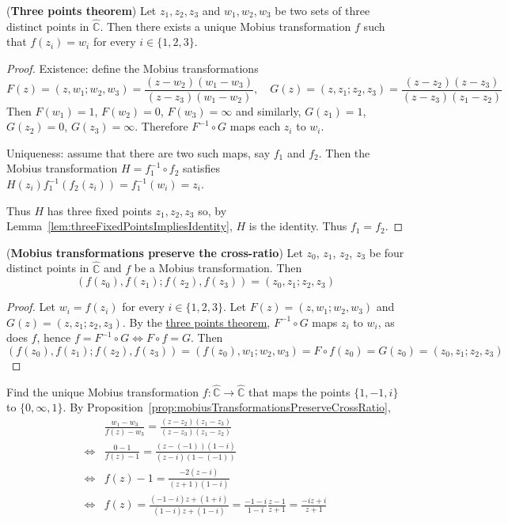\begin{theorem}\label{thm:threePointsTheorem}
	(\textbf{Three points theorem}) Let ${z_1, z_2, z_3}$ and ${w_1, w_2, w_3}$ be two sets of three distinct points in $\hat{\mathbb{C}}$. Then there exists a unique Mobius transformation $f$ such that $f(z_i) = w_i$ for every $i \in \{1, 2, 3\}$.
\end{theorem}

\begin{proof}
	Existence: define the Mobius transformations
	\[
		F(z) = (z, w_1; w_2, w_3) = \frac{(z - w_2)(w_1 - w_3)}{(z - z_3)(w_1 - w_2)}, \quad G(z) = (z, z_1; z_2, z_3) = \frac{(z - z_2)(z - z_3)}{(z - z_3)(z_1 - z_2)}
	\]
	Then $F(w_1) = 1$, $F(w_2) = 0$, $F(w_3) = \infty$ and similarly, $G(z_1) = 1$, $G(z_2) = 0$, $G(z_3) = \infty$. Therefore $F^{-1} \circ G$ maps each $z_i$ to $w_i$.

	Uniqueness: assume that there are two such maps, say $f_1$ and $f_2$. Then the Mobius transformation $H = f_1^{-1} \circ f_2$ satisfies $H(z_i) f_1^{-1}(f_2(z_i)) = f_1^{-1}(w_i) = z_i$.

	Thus $H$ has three fixed points $z_1, z_2, z_3$ so, by Lemma~\ref{lem:threeFixedPointsImpliesIdentity}, $H$ is the identity. Thus $f_1 = f_2$.
\end{proof}

\begin{proposition}\label{prop:mobiusTransformationsPreserveCrossRatio}
	(\textbf{Mobius transformations preserve the cross-ratio}) Let $z_0$, $z_1$, $z_2$, $z_3$ be four distinct points in $\hat{\mathbb{C}}$ and $f$ be a Mobius transformation. Then
	\[
		(f(z_0), f(z_1); f(z_2), f(z_3)) = (z_0, z_1; z_2, z_3)
	\]
\end{proposition}

\begin{proof}
	Let $w_i = f(z_i)$ for every $i \in \{1, 2, 3\}$. Let $F(z) = (z, w_1; w_2, w_3)$ and $G(z) = (z, z_1; z_2, z_3)$. By the \hyperref[thm:threePointsTheorem]{three points theorem}, $F^{-1} \circ G$ maps $z_i$ to $w_i$, as does $f$, hence $f = F^{-1} \circ G \Longleftrightarrow F \circ f = G$. Then
	\[
		(f(z_0), f(z_1); f(z_2), f(z_3)) = (f(z_0), w_1; w_2, w_3) = F \circ f (z_0) = G(z_0) = (z_0, z_1; z_2, z_3)
	\]
\end{proof}

\begin{example}
	Find the unique Mobius transformation $f: \hat{\mathbb{C}} \to \hat{\mathbb{C}}$ that maps the points $\{ 1, -1, i \}$ to $\{ 0, \infty, 1 \}$. By Proposition~\ref{prop:mobiusTransformationsPreserveCrossRatio},
	\[
		\begin{aligned}
			& \frac{w_1 - w_3}{f(z) - w_3} = \frac{(z - z_2)(z_1 - z_3)}{(z - z_3)(z_1 - z_2)} \\
			\Longleftrightarrow & \frac{0 - 1}{f(z) - 1} = \frac{(z - (-1))(1 - i)}{(z - i)(1 - (-1))} \\
			\Longleftrightarrow & f(z) - 1 = \frac{-2(z - i)}{(z + 1)(1 - i)} \\
			\Longleftrightarrow & f(z) = \frac{(-1 - i)z + (1 + i)}{(1 - i)z + (1 - i)} = \frac{-1 - i}{1 - i} \frac{z - 1}{z + 1} = \frac{-iz + i}{z + 1}
		\end{aligned}
	\]
\end{example}

